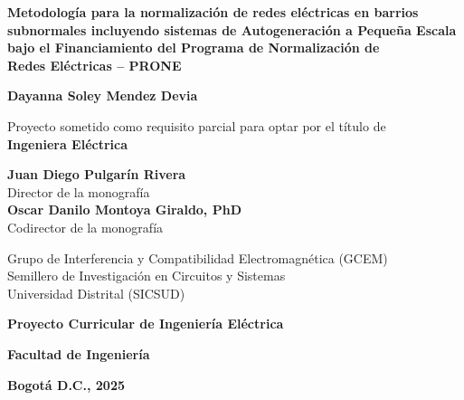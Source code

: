 \begin{titlepage}
\centering

\vspace*{1cm}

{\large\bfseries
Metodología para la normalización de redes eléctricas en barrios\\[4pt]
subnormales incluyendo sistemas de Autogeneración a Pequeña Escala\\[4pt]
bajo el Financiamiento del Programa de Normalización de\\[4pt]
Redes Eléctricas -- PRONE
\par}

\vspace{1.2cm}

{\normalsize\bfseries Dayanna Soley Mendez Devia \par}

\vspace{0.8cm}

{\normalsize
Proyecto sometido como requisito parcial para optar por el título de\\[4pt]
\textbf{Ingeniera Eléctrica}
\par}

\vspace{1cm}

{\normalsize
\textbf{Juan Diego Pulgarín Rivera}\\
Director de la monografía\\[10pt]
\textbf{Oscar Danilo Montoya Giraldo, PhD}\\
Codirector de la monografía
\par}

\vspace{1cm}

{\small
Grupo de Interferencia y Compatibilidad Electromagnética (GCEM)\\
Semillero de Investigación en Circuitos y Sistemas\\
Universidad Distrital (SICSUD)
\par}

\vspace{0.8cm}

{\normalsize\bfseries Proyecto Curricular de Ingeniería Eléctrica \par}
{\normalsize\bfseries Facultad de Ingeniería \par}


{\normalsize\bfseries Bogotá D.C., 2025 \par}

\end{titlepage}